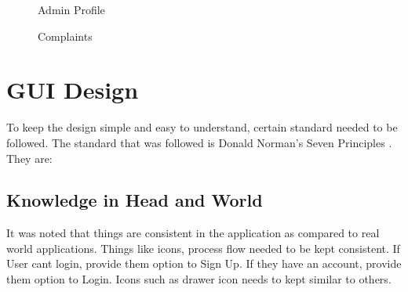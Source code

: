 \begin{figure}[H]
	\begin{center}
		\caption{Admin Profile}
	\end{center}
\end{figure}
\begin{figure}[H]
	\begin{center}
		\caption{Complaints}
		\label{fig:cpm_admin}
	\end{center}
\end{figure}

\section{GUI Design}
To keep the design simple and easy to understand, certain standard needed to be followed. The standard that was followed is Donald Norman's Seven Principles \cite{donald}. They are:
\subsection{Knowledge in Head and World}
It was noted that things are consistent in the application as compared to real world applications. Things like icons, process flow needed to be kept consistent. If User cant login, provide them option to Sign Up. If they have an account, provide them option to Login. Icons such as drawer icon needs to kept similar to others.
